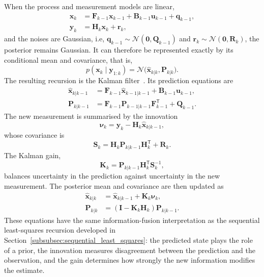 When the process and measurement models are linear,
\begin{subequations}
\begin{align}
\mathbf{x}_k &= \mathbf{F}_{k-1}\mathbf{x}_{k-1} +\mathbf{B}_{k-1}\mathbf{u}_{k-1} + \mathbf{q}_{k-1}, \label{eq:kf_linear_process}\\
\mathbf{y}_k &= \mathbf{H}_k\mathbf{x}_k+\mathbf{r}_k,
\label{eq:kf_linear_measurement}
\end{align}    
\end{subequations}
and the noises are Gaussian, i.e, $\mathbf{q}_{k-1}\sim \mathcal{N}(\mathbf{0},\mathbf{Q}_{k-1})$ and $\mathbf{r}_k\sim \mathcal{N}(\mathbf{0},\mathbf{R}_k)$, the posterior remains Gaussian. It can therefore be represented exactly by its conditional mean and covariance, that is,
\begin{equation}
p(\mathbf{x}_k\mid\mathbf{y}_{1:k}) = \mathcal{N} \bigl(\widehat{\mathbf{x}}_{k|k}, \mathbf{P}_{k|k} \bigr).
\end{equation}
The resulting recursion is the Kalman filter~\cite{kalman_1960}. Its
prediction equations are
\begin{align}
\widehat{\mathbf{x}}_{k|k-1}
&=
\mathbf{F}_{k-1}\widehat{\mathbf{x}}_{k-1|k-1}
+
\mathbf{B}_{k-1}\mathbf{u}_{k-1},
\label{eq:kf_state_prediction}\\
\mathbf{P}_{k|k-1}
&=
\mathbf{F}_{k-1}\mathbf{P}_{k-1|k-1}
\mathbf{F}_{k-1}^{\mathsf T}
+
\mathbf{Q}_{k-1}.
\label{eq:kf_cov_prediction}
\end{align}
The new measurement is summarised by the innovation
\begin{equation}
\boldsymbol{\nu}_k
=
\mathbf{y}_k-
\mathbf{H}_k\widehat{\mathbf{x}}_{k|k-1},
\label{eq:kf_innovation}
\end{equation}
whose covariance is
\begin{equation}
\mathbf{S}_k
=
\mathbf{H}_k\mathbf{P}_{k|k-1}\mathbf{H}_k^{\mathsf T}
+
\mathbf{R}_k.
\label{eq:kf_innovation_covariance}
\end{equation}
The Kalman gain,
\begin{equation}
\mathbf{K}_k
=
\mathbf{P}_{k|k-1}\mathbf{H}_k^{\mathsf T}
\mathbf{S}_k^{-1},
\label{eq:kf_gain}
\end{equation}
balances uncertainty in the prediction against uncertainty in the new
measurement. The posterior mean and covariance are then updated as
\begin{align}
\widehat{\mathbf{x}}_{k|k} &= \widehat{\mathbf{x}}_{k|k-1} + \mathbf{K}_k\boldsymbol{\nu}_k, \label{eq:kf_state_update}\\
\mathbf{P}_{k|k} &= (\mathbf{I}-\mathbf{K}_k\mathbf{H}_k) \mathbf{P}_{k|k-1}. \label{eq:kf_cov_update}
\end{align} 
These equations have the same information-fusion interpretation as the sequential least-squares recursion developed in Section~\ref{subsubsec:sequential_least_squares}: the predicted state plays the role of a prior, the innovation measures disagreement between the prediction and the observation, and the gain determines how strongly the new information modifies the estimate.


